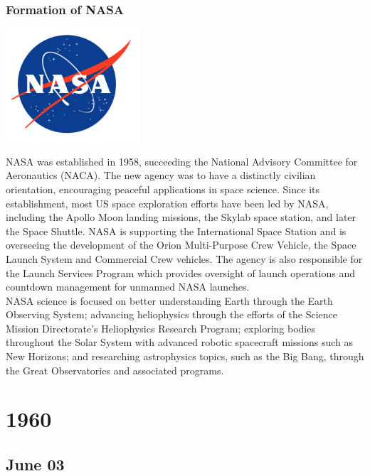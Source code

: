 \documentclass[11pt]{report}
\begin{document}
\subsection{Formation of NASA}
\vspace{2mm}\begin{center}\includegraphics[width=5cm]{./img/nasaLogo.jpg}\end{center}
NASA was established in 1958, succeeding the National Advisory Committee for Aeronautics (NACA). The new agency was to have a distinctly civilian orientation, encouraging peaceful applications in space science. Since its establishment, most US space exploration efforts have been led by NASA, including the Apollo Moon landing missions, the Skylab space station, and later the Space Shuttle. NASA is supporting the International Space Station and is overseeing the development of the Orion Multi-Purpose Crew Vehicle, the Space Launch System and Commercial Crew vehicles. The agency is also responsible for the Launch Services Program which provides oversight of launch operations and countdown management for unmanned NASA launches.\\
\indent NASA science is focused on better understanding Earth through the Earth Observing System; advancing heliophysics through the efforts of the Science Mission Directorate's Heliophysics Research Program; exploring bodies throughout the Solar System with advanced robotic spacecraft missions such as New Horizons; and researching astrophysics topics, such as the Big Bang, through the Great Observatories and associated programs.

\chapter{1960}
\section{June 03}
\end{document}

